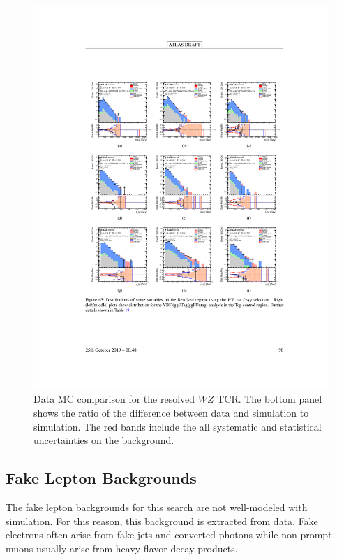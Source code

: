 \begin{figure}[h!]
  \centering
  \includegraphics[width=\hsize , height=\textheight , keepaspectratio]{figures/Analysis/datamc/resolved_wz_tcr.pdf}
      \caption{Data MC comparison for the resolved $WZ$ TCR. The bottom panel shows the ratio of the difference between data and simulation to simulation. The red bands include the all systematic and statistical uncertainties on the background. } 
  \label{fig:resolved_wz_TCR_datamc}
\end{figure} 
\FloatBarrier
\subsection{Fake Lepton Backgrounds}
\label{fakelep}
The fake lepton backgrounds for this search are not well-modeled with simulation. For this reason, this background is extracted from data. Fake electrons often arise from fake jets and converted photons while non-prompt muons usually arise from heavy flavor decay products.

